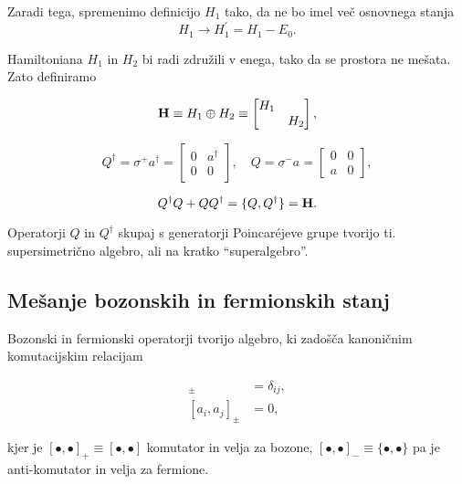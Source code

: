 \ni Zaradi tega, spremenimo definicijo $H_1$ tako, da ne bo imel ve\v c osnovnega stanja
\begin{equation}
	H_1 \to H_1^\prime = H_1 - E_0.
\end{equation}

Hamiltoniana $H_1$ in $H_2$ bi radi zdru\v zili v enega, tako da se prostora ne me\v sata. Zato
definiramo

\begin{equation}
	\mathbf{H} \equiv H_1 \oplus H_2 \equiv \begin{bmatrix}H_1 & \\
		& H_2 \end{bmatrix},
\end{equation}

\begin{equation}
	Q^\dagger = \sigma^+ a^\dagger = \begin{bmatrix} 0 & a^\dagger \\
		0 & 0 \end{bmatrix}, \quad
	Q = \sigma^- a = \begin{bmatrix} 0 & 0 \\
		a & 0 \end{bmatrix},
	\label{superop}
\end{equation}

\begin{equation}
	Q^\dagger Q + QQ^\dagger = \{Q, Q^\dagger\} = \mathbf{H}.
\end{equation}

Operatorji $Q$ in $Q^\dagger$ skupaj s generatorji Poincaréjeve grupe tvorijo ti. supersimetri\v cno algebro, ali
na kratko "`superalgebro"'.

\subsection{Me\v sanje bozonskih in fermionskih stanj}

Bozonski in fermionski operatorji tvorijo algebro, ki zado\v s\v ca kanoni\v cnim komutacijskim relacijam

\begin{align}
	[a_i, a_j^\dagger]_\pm &= \delta_{ij}, \\
	[a_i, a_j]_\pm &= 0,
\end{align}

\ni kjer je $[\bullet,\bullet]_+ \equiv [\bullet,\bullet]$ komutator in velja za bozone,
$[\bullet,\bullet]_- \equiv \{\bullet,\bullet\}$ pa je anti-komutator in velja za fermione.

